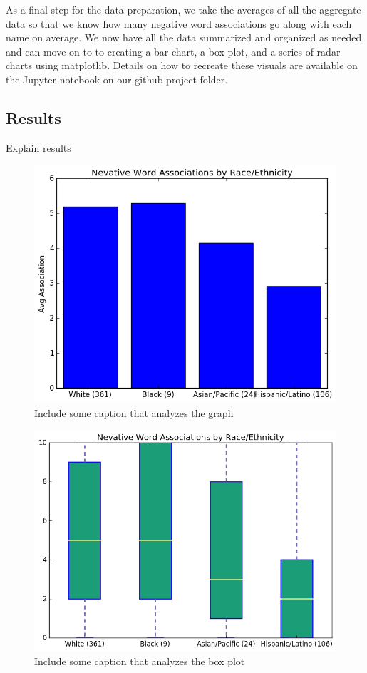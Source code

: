 \documentclass[sigconf]{acmart}
\begin{document}
As a final step for the data preparation, we take the averages of all the aggregate data so that we know how many negative word associations go along with each name on average. We now have all the data summarized and organized as needed and can move on to to creating a bar chart, a box plot, and a series of radar charts using matplotlib. Details on how to recreate these visuals are available on the Jupyter notebook on our github project folder.









\subsection{Results}

Explain results

\begin{figure}
\includegraphics[width=\columnwidth]{images/fig1.png}
\caption{Include some caption that analyzes the graph}
\label{Figure 1}
\end{figure}

\begin{figure}
\includegraphics[width=\columnwidth]{images/fig2.png}
\caption{Include some caption that analyzes the box plot}
\label{Figure 2}
\end{figure}
\end{document}
